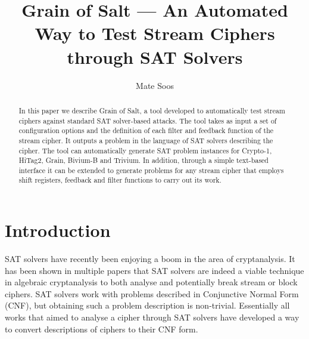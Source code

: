 \documentclass{llncs}
\begin{document}

\title{Grain of Salt --- An Automated Way to Test Stream Ciphers through SAT Solvers}
\author{Mate Soos}

\maketitle

\begin{abstract}
In this paper we describe Grain of Salt, a tool developed to automatically test stream ciphers against standard SAT solver-based attacks. The tool takes as input a set of configuration options and the definition of each filter and feedback function of the stream cipher. It outputs a problem in the language of SAT solvers describing the cipher. The tool can automatically generate SAT problem instances for Crypto-1, HiTag2, Grain, Bivium-B and Trivium. In addition, through a simple text-based interface it can be extended to generate problems for any stream cipher that employs shift registers, feedback and filter functions to carry out its work.
\end{abstract}

\section{Introduction}
SAT solvers have recently been enjoying a boom in the area of cryptanalysis. It has been shown in multiple papers \cite{DBLP:conf/ima/CourtoisB07,BiviumWithSATsolvers,DBLP:conf/sat/SoosNC09} that SAT solvers are indeed a viable technique in algebraic cryptanalysis to both analyse and potentially break stream or block ciphers. SAT solvers work with problems described in Conjunctive Normal Form (CNF), but obtaining such a problem description is non-trivial. Essentially all works that aimed to analyse a cipher through SAT solvers have developed a way to convert descriptions of ciphers to their CNF form.
\end{document}
